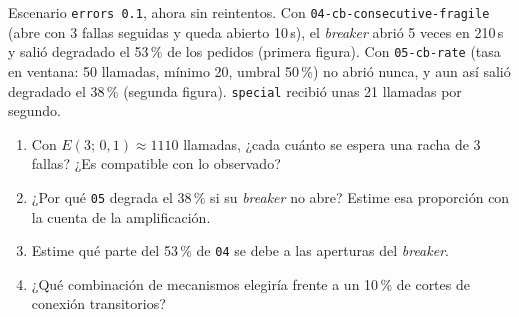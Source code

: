 \documentclass[variant=guia,cover=institutional,mode=screen]{ua-engineering-v6-article}
\begin{document}
\begin{uaexercise}
Escenario \texttt{errors 0.1}, ahora sin reintentos. Con \texttt{04-cb-consecutive-fragile} (abre con 3 fallas seguidas y queda abierto 10\,s), el \emph{breaker} abrió 5 veces en 210\,s y salió degradado el 53\,\% de los pedidos (primera figura). Con \texttt{05-cb-rate} (tasa en ventana: 50 llamadas, mínimo 20, umbral 50\,\%) no abrió nunca, y aun así salió degradado el 38\,\% (segunda figura). \texttt{special} recibió unas 21 llamadas por segundo.
\begin{enumerate}
\item Con $E(3;\,0{,}1) \approx 1110$ llamadas, ¿cada cuánto se espera una racha de 3 fallas? ¿Es compatible con lo observado?
\item ¿Por qué \texttt{05} degrada el 38\,\% si su \emph{breaker} no abre? Estime esa proporción con la cuenta de la amplificación.
\item Estime qué parte del 53\,\% de \texttt{04} se debe a las aperturas del \emph{breaker}.
\item ¿Qué combinación de mecanismos elegiría frente a un 10\,\% de cortes de conexión transitorios?
\end{enumerate}
\end{uaexercise}
\end{document}
